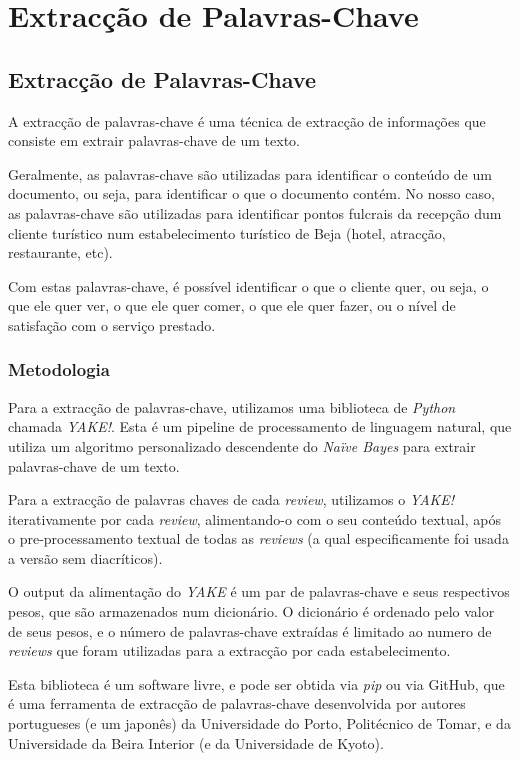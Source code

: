 \chapter{Extracção de Palavras-Chave}
\label{cap5}

\section{Extracção de Palavras-Chave}

A extracção de palavras-chave é uma técnica de extracção de informações que consiste em extrair palavras-chave de um texto.

Geralmente, as palavras-chave são utilizadas para identificar o conteúdo de um documento, ou seja, para identificar o que o documento contém. No nosso caso, as palavras-chave são utilizadas para identificar pontos fulcrais da recepção dum cliente turístico num estabelecimento turístico de Beja (hotel, atracção, restaurante, etc).

Com estas palavras-chave, é possível identificar o que o cliente quer, ou seja, o que ele quer ver, o que ele quer comer, o que ele quer fazer, ou o nível de satisfação com o serviço prestado.

\subsection{Metodologia}

Para a extracção de palavras-chave, utilizamos uma biblioteca de \textit{Python} chamada \textit{YAKE!}. Esta é um pipeline de processamento de linguagem natural, que utiliza um algoritmo personalizado descendente do \textit{Naïve Bayes} para extrair palavras-chave de um texto.

Para a extracção de palavras chaves de cada \textit{review}, utilizamos o \textit{YAKE!} iterativamente por cada \textit{review}, alimentando-o com o seu conteúdo textual, após o pre-processamento textual de todas as \textit{reviews} (a qual especificamente foi usada a versão sem diacríticos).

O output da alimentação do \textit{YAKE} é um par de palavras-chave e seus respectivos pesos, que são armazenados num dicionário. O dicionário é ordenado pelo valor de seus pesos, e o número de palavras-chave extraídas é limitado ao numero de \textit{reviews} que foram utilizadas para a extracção por cada estabelecimento.


Esta biblioteca é um software livre, e pode ser obtida via \textit{pip} ou via GitHub, que é uma ferramenta de extracção de palavras-chave desenvolvida por autores portugueses (e um japonês) da Universidade do Porto, Politécnico de Tomar, e da Universidade da Beira Interior (e da Universidade de Kyoto).

